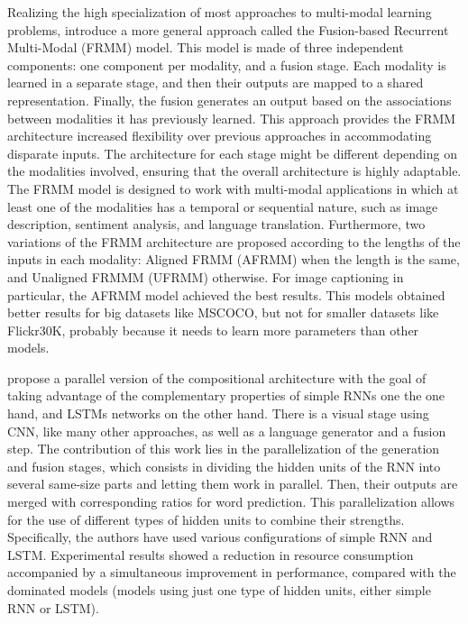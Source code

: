 Realizing the high specialization of most approaches to multi-modal learning problems, \citet{Oruganti2016} introduce a more general approach called the Fusion-based Recurrent Multi-Modal (FRMM) model. This model is made of three independent components: one component per modality, and a fusion stage. Each modality is learned in a separate stage, and then their outputs are mapped to a shared representation. Finally, the fusion generates an output based on the associations between modalities it has previously learned. This approach provides the FRMM architecture increased flexibility over previous approaches in accommodating disparate inputs. The architecture for each stage might be different depending on the modalities involved, ensuring that the overall architecture is highly adaptable. The FRMM model is designed to work with multi-modal applications in which at least one of the modalities has a temporal or sequential nature, such as image description, sentiment analysis, and language translation. Furthermore, two variations of the FRMM architecture are proposed according to the lengths of the inputs in each modality: Aligned FRMM (AFRMM) when the length is the same, and Unaligned FRMMM (UFRMM) otherwise. For image captioning in particular, the AFRMM model achieved the best results. This models obtained better results for big datasets like MSCOCO, but not for smaller datasets like Flickr30K, probably because it needs to learn more parameters than other models. 

\citet{Wang2016_Parallel} propose a parallel version of the compositional architecture with the goal of taking advantage of the complementary properties of simple RNNs one the one hand, and LSTMs networks on the other hand. There is a visual stage using CNN, like many other approaches, as well as a language generator and a fusion step. The contribution of this work lies in the parallelization of the generation and fusion stages, which consists in dividing the hidden units of the RNN into several same-size parts and letting them work in parallel. Then, their outputs are merged with corresponding ratios for word prediction. This parallelization allows for the use of different types of hidden units to combine their strengths. Specifically, the authors have used various configurations of simple RNN and LSTM. Experimental results showed a reduction in resource consumption accompanied by a simultaneous improvement in performance, compared with the dominated models (models using just one type of hidden units, either simple RNN or LSTM).

